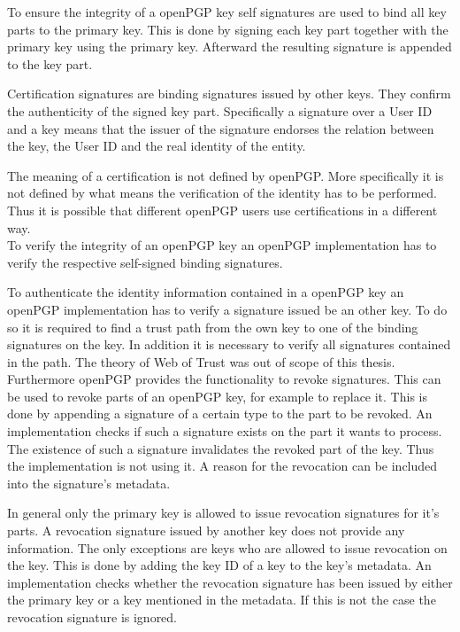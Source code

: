 To ensure the integrity of a openPGP key self signatures are used to bind all key parts to the primary key. This is done by signing each key part together with the primary key using the primary key. Afterward the resulting signature is appended to the key part.

Certification signatures are binding signatures issued by other keys. They confirm the authenticity of the signed key part. Specifically a signature over a User ID and a key means that the issuer of the signature endorses the relation between the key, the User ID and the real identity of the entity.

The meaning of a certification is not defined by openPGP. More specifically it is not defined by what means the verification of the identity has to be performed. Thus it is possible that different openPGP users use certifications in a different way. \\

To verify the integrity of an openPGP key an openPGP implementation has to verify the respective self-signed binding signatures. 

To authenticate the identity information contained in a openPGP key an openPGP implementation has to verify a signature issued be an other key. To do so it is required to find a trust path from the own key to one of the binding signatures on the key. In addition it is necessary to verify all signatures contained in the path. The theory of Web of Trust was out of scope of this thesis. \\

Furthermore openPGP provides the functionality to revoke signatures. This can be used to revoke parts of an openPGP key, for example to replace it. This is done by appending a signature of a certain type to the part to be revoked. An implementation checks if such a signature exists on the part it wants to process. The existence of such a signature invalidates the revoked part of the key. Thus the implementation is not using it. A reason for the revocation can be included into the signature's metadata. 

In general only the primary key is allowed to issue revocation signatures for it's parts. A revocation signature issued by another key does not provide any information. The only exceptions are keys who are allowed to issue revocation on the key. This is done by adding the key ID of a key to the key's metadata. An implementation checks whether the revocation signature has been issued by either the primary key or a key mentioned in the metadata. If this is not the case the revocation signature is ignored.

